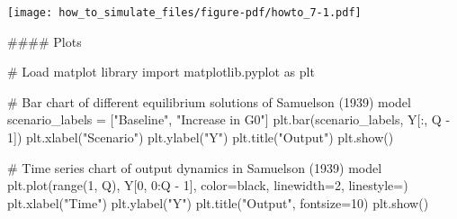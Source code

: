 \documentclass[
  letterpaper,
  DIV=11,
  numbers=noendperiod]{scrreprt}
\newenvironment{Shaded}{\begin{snugshade}}{\end{snugshade}}
\newcommand{\BuiltInTok}[1]{\textcolor[rgb]{0.00,0.23,0.31}{#1}}
\newcommand{\CommentTok}[1]{\textcolor[rgb]{0.37,0.37,0.37}{#1}}
\newcommand{\DecValTok}[1]{\textcolor[rgb]{0.68,0.00,0.00}{#1}}
\newcommand{\ImportTok}[1]{\textcolor[rgb]{0.00,0.46,0.62}{#1}}
\newcommand{\NormalTok}[1]{\textcolor[rgb]{0.00,0.23,0.31}{#1}}
\newcommand{\OperatorTok}[1]{\textcolor[rgb]{0.37,0.37,0.37}{#1}}
\newcommand{\StringTok}[1]{\textcolor[rgb]{0.13,0.47,0.30}{#1}}
\begin{document}
\texttt{[image: how\_to\_simulate\_files/figure-pdf/howto\_7-1.pdf]}

\begin{tcolorbox}[enhanced jigsaw, titlerule=0mm, breakable, bottomrule=.15mm, toprule=.15mm, colbacktitle=quarto-callout-note-color!10!white, rightrule=.15mm, toptitle=1mm, opacityback=0, left=2mm, coltitle=black, title=\textcolor{quarto-callout-note-color}{\faInfo}\hspace{0.5em}{Python code}, colframe=quarto-callout-note-color-frame, opacitybacktitle=0.6, leftrule=.75mm, bottomtitle=1mm, arc=.35mm, colback=white]

\begin{Shaded}
\begin{Highlighting}[]
\CommentTok{\#\#\#\# Plots}

\CommentTok{\# Load matplot library}
\ImportTok{import}\NormalTok{ matplotlib.pyplot }\ImportTok{as}\NormalTok{ plt}

\CommentTok{\# Bar chart of different equilibrium solutions of Samuelson (1939) model}
\NormalTok{scenario\_labels }\OperatorTok{=}\NormalTok{ [}\StringTok{"Baseline"}\NormalTok{, }\StringTok{"Increase in G0"}\NormalTok{]}
\NormalTok{plt.bar(scenario\_labels, Y[:, Q }\OperatorTok{{-}} \DecValTok{1}\NormalTok{])}
\NormalTok{plt.xlabel(}\StringTok{"Scenario"}\NormalTok{)}
\NormalTok{plt.ylabel(}\StringTok{"Y"}\NormalTok{)}
\NormalTok{plt.title(}\StringTok{"Output"}\NormalTok{)}
\NormalTok{plt.show()}

\CommentTok{\# Time series chart of output dynamics in Samuelson (1939) model}
\NormalTok{plt.plot(}\BuiltInTok{range}\NormalTok{(}\DecValTok{1}\NormalTok{, Q), Y[}\DecValTok{0}\NormalTok{, }\DecValTok{0}\NormalTok{:Q }\OperatorTok{{-}} \DecValTok{1}\NormalTok{], color}\OperatorTok{=}\StringTok{\textquotesingle{}black\textquotesingle{}}\NormalTok{, linewidth}\OperatorTok{=}\DecValTok{2}\NormalTok{, linestyle}\OperatorTok{=}\StringTok{\textquotesingle{}{-}\textquotesingle{}}\NormalTok{)}
\NormalTok{plt.xlabel(}\StringTok{"Time"}\NormalTok{)}
\NormalTok{plt.ylabel(}\StringTok{"Y"}\NormalTok{)}
\NormalTok{plt.title(}\StringTok{"Output"}\NormalTok{, fontsize}\OperatorTok{=}\DecValTok{10}\NormalTok{)}
\NormalTok{plt.show()}


\end{Highlighting}
\end{Shaded}
\end{tcolorbox}
\end{document}
